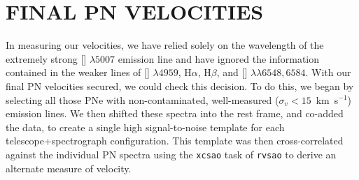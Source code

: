 \documentclass[12pt,preprint]{emulateapj}
\newcommand{\kms}{km~s$^{-1}$}
\begin{document}
\section{FINAL PN VELOCITIES}
In measuring our velocities, we have relied solely on the wavelength of the extremely strong [] $\lambda 5007$ emission line and have ignored the information contained in the weaker lines of [] $\lambda 4959$, H$\alpha$, H$\beta$,  and [] $\lambda\lambda 6548,6584$.  With our final PN velocities secured, we could check this decision.  To do this, we began by selecting all those PNe with non-contaminated, well-measured ($\sigma_v < 15$~\kms) emission lines.  We then shifted these spectra into the rest frame, and co-added the data, to create a single high signal-to-noise template for each telescope+spectrograph configuration.  This template was then cross-correlated against the individual PN spectra using the {\tt xcsao} task of {\tt rvsao} to derive an alternate measure of velocity. 
\end{document}
